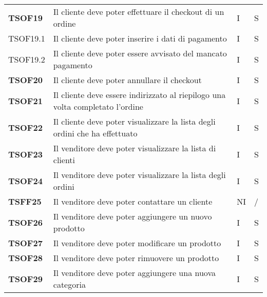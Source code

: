 \begin{center}
\begin{longtable}[!h]{p{60px} p{240px} p{35px} p{35px}}
        \textbf{TSOF19} & Il cliente deve poter effettuare il checkout di un ordine                                           & I              & S              \\
        TSOF19.1        & Il cliente deve poter inserire i dati di pagamento                                                  & I              & S              \\
        TSOF19.2        & Il cliente deve poter essere avvisato del mancato pagamento                                         & I              & S              \\
        \textbf{TSOF20} & Il cliente deve poter annullare il checkout                                                         & I              & S              \\
        \textbf{TSOF21} & Il cliente deve essere indirizzato al riepilogo una volta completato l'ordine                       & I              & S              \\
        \textbf{TSOF22} & Il cliente deve poter visualizzare la lista degli ordini che ha effettuato                          & I              & S              \\
        \textbf{TSOF23} & Il venditore deve poter visualizzare la lista di clienti                                            & I              & S              \\
        \textbf{TSOF24} & Il venditore deve poter visualizzare la lista degli ordini                                          & I              & S              \\
        \textbf{TSFF25} & Il venditore deve poter contattare un cliente                                                       & NI             & /              \\
        \textbf{TSOF26} & Il venditore deve poter aggiungere un nuovo prodotto                                                & I              & S              \\
        \textbf{TSOF27} & Il venditore deve poter modificare un prodotto                                                      & I              & S              \\
        \textbf{TSOF28} & Il venditore deve poter rimuovere un prodotto                                                       & I              & S              \\
        \textbf{TSOF29} & Il venditore deve poter aggiungere una nuova categoria                                              & I              & S              \\

\end{longtable}
\end{center}

